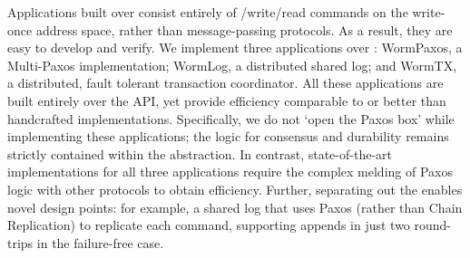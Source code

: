 Applications built over \sysname{} consist entirely of \prepare{}/write/read commands on the write-once address space, rather than message-passing protocols. As a result, they are easy to develop and verify. We implement three applications over \sysname{}: WormPaxos, a Multi-Paxos implementation; WormLog, a distributed shared log; and WormTX, a distributed, fault tolerant transaction coordinator. All these applications are built entirely over the \WOR{} API, yet provide efficiency comparable to or better than handcrafted implementations. Specifically, we do not `open the Paxos box' while implementing these applications; the logic for consensus and durability remains strictly contained within the \WOR{} abstraction. In contrast, state-of-the-art implementations for all three applications require the complex melding of Paxos logic with other protocols to obtain efficiency. Further, separating out the \WOR{} enables novel design points: for example, a shared log that uses Paxos (rather than Chain Replication) to replicate each command, supporting appends in just two round-trips in the failure-free case.
%


